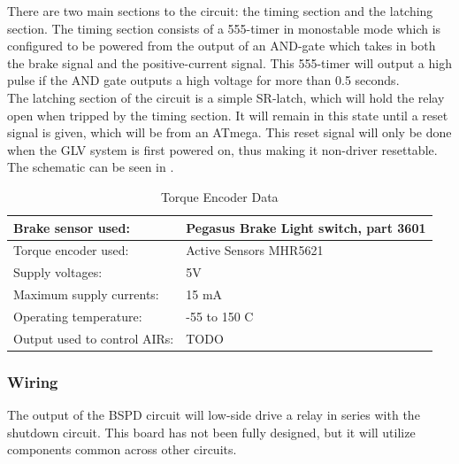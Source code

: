 \documentclass{article}
\begin{document}
There are two main sections to the circuit: the timing section and the latching section. The timing section consists of a 555-timer in monostable mode which is configured to be powered from the output of an AND-gate which takes in both the brake signal and the positive-current signal. This 555-timer will output a high pulse if the AND gate outputs a high voltage for more than 0.5 seconds. \\

The latching section of the circuit is a simple SR-latch, which will hold the relay open when tripped by the timing section. It will remain in this state until a reset signal is given, which will be from an ATmega. This reset signal will only be done when the GLV system is first powered on, thus making it non-driver resettable. \\

The schematic can be seen in . \\

	\begin{table}[H]
	    \centering
	    \begin{tabular}{|l|l|}
	    \hline
	    Brake sensor used: & Pegasus Brake Light switch, part 3601 \\ \hline
	    Torque encoder used: &  Active Sensors MHR5621\\ \hline
	    Supply voltages: & 5V \\ \hline
	    Maximum supply currents: & 15 mA\\ \hline
	    Operating temperature: & -55 to 150 \degree C \\ \hline
	    Output used to control AIRs: & TODO \\ \hline
	    \end{tabular}
	    \caption{Torque Encoder Data}
	    \label{TorqueEncoder1}
	\end{table}


\subsubsection{Wiring}

The output of the BSPD circuit will low-side drive a relay in series with the shutdown circuit. This board has not been fully designed, but it will utilize components common across other circuits.
\end{document}
